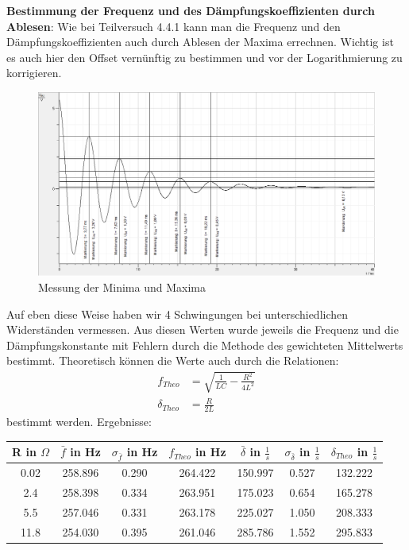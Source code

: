 \documentclass[12pt,a4paper]{article}
\begin{document}
\textbf{Bestimmung der Frequenz und des Dämpfungskoeffizienten durch Ablesen}: \newline
Wie bei Teilversuch 4.4.1 kann man die Frequenz und den Dämpfungskoeffizienten auch durch Ablesen der Maxima errechnen. Wichtig ist es auch hier den Offset vernünftig zu bestimmen und vor der Logarithmierung zu korrigieren.

\begin{figure}[H]
\caption{Messung der Minima und Maxima}
\centering
\includegraphics[scale=0.5]{Bilder/Einhuellende.png}
\end{figure}

Auf eben diese Weise haben wir 4 Schwingungen bei unterschiedlichen Widerständen vermessen.  Aus diesen Werten wurde jeweils die Frequenz und die Dämpfungskonstante mit Fehlern durch die Methode des gewichteten Mittelwerts bestimmt.\newline
Theoretisch können die Werte auch durch die Relationen:
\begin{align}
f_{Theo}&=\sqrt{\frac{1}{LC}-\frac{R^2}{4L^2}} \\
\delta_{Theo}&=\frac{R}{2L} 
\end{align}
bestimmt werden. \newline
Ergebnisse:
\begin{center}
\begin{tabular}{c|c|c|c|c|c|c}
R in $\Omega$ & $\bar{f}$ in Hz & $\sigma_{\bar{f}}$ in Hz & $f_{Theo}$ in Hz &  $\bar{\delta}$ in $\frac{1}{s}$ & $\sigma_{\bar{\delta}}$ in $\frac{1}{s}$  & $\delta_{Theo}$ in $\frac{1}{s}$ \\ 
\hline 
0.02 & 258.896 & 0.290 & 264.422 & 150.997 & 0.527 & 132.222 \\ 
\hline 
2.4 & 258.398 & 0.334 & 263.951 & 175.023 & 0.654  & 165.278\\ 
\hline 
5.5 & 257.046 & 0.331 & 263.178 & 225.027 & 1.050  & 208.333\\ 
\hline 
11.8 & 254.030 & 0.395 & 261.046 & 285.786 & 1.552  & 295.833 \\ 
\end{tabular} 
\end{center}
\end{document}
